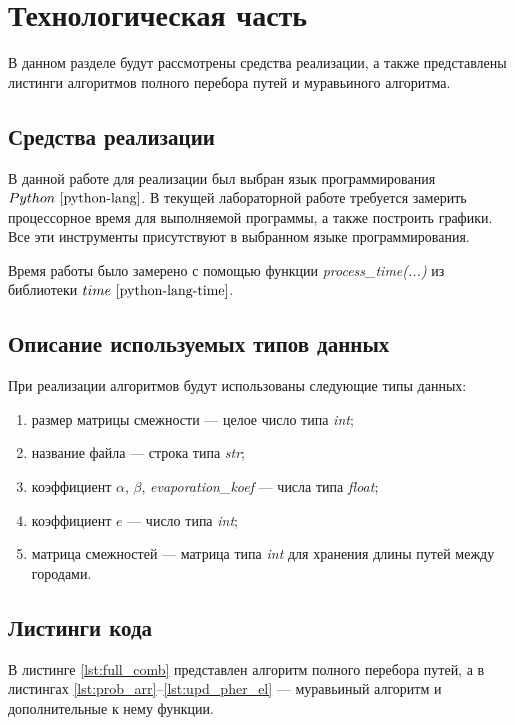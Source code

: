 \chapter{Технологическая часть}

В данном разделе будут рассмотрены средства реализации, а также представлены листинги алгоритмов полного перебора путей и муравьиного алгоритма.

\section{Средства реализации}
В данной работе для реализации был выбран язык программирования $Python~\cite{python-lang}$. В текущей лабораторной работе требуется замерить процессорное время для выполняемой программы, а также построить графики. Все эти инструменты присутствуют в выбранном языке программирования.

Время работы было замерено с помощью функции \textit{process\_time(...)} из библиотеки $time~\cite{python-lang-time}$.

\section{Описание используемых типов данных}

При реализации алгоритмов будут использованы следующие типы данных:

\begin{enumerate}[label=\arabic*)]
	\item размер матрицы смежности --- целое число типа \textit{int};
	\item название файла --- строка типа \textit{str};
	\item коэффициент $\alpha$, $\beta$, \textit{evaporation\_koef} --- числа типа \textit{float};
	\item коэффициент $e$ --- число типа \textit{int};
	\item матрица смежностей --- матрица типа \textit{int} для хранения длины путей между городами.
\end{enumerate}


\section{Листинги кода}

В листинге \ref{lst:full_comb} представлен алгоритм полного перебора путей, а в листингах \ref{lst:prob_arr}--\ref{lst:upd_pher_el} --- муравьиный алгоритм и дополнительные к нему функции.

